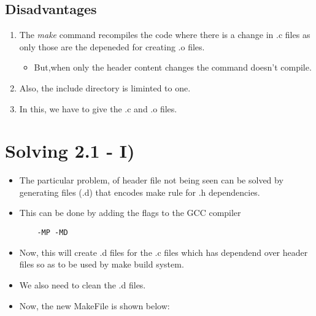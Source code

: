 \documentclass{article}
\begin{document}
\subsection{Disadvantages}
\begin{enumerate}[label=\Roman*)]
    \item The \emph{make} command recompiles the code where there is a change in .c files as only those are the depeneded for creating .o files.
          \begin{itemize}
              \item But,when only the header content changes the command doesn't compile.
          \end{itemize}
    \item Also, the include directory is liminted to one.
    \item In this, we have to give the .c and .o files.
\end{enumerate}


\section{Solving 2.1 - I)}
\begin{itemize}
    \item The particular problem, of header file not being seen can be solved by generating files (.d) that encodes make rule for .h dependencies.
    \item This can be done by adding the flags to the GCC compiler
          \begin{verbatim}
    -MP -MD
    \end{verbatim}
    \item Now, this will create .d files for the .c files which has dependend over header files so as to be used by make build system.
    \item We also need to clean the .d files.
    \item Now, the new MakeFile is shown below:
\end{itemize}
\end{document}
